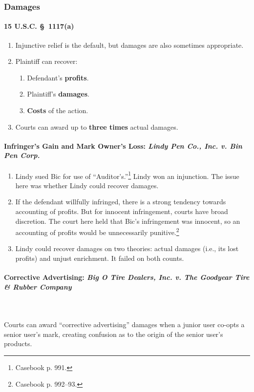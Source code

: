 \subsubsection{Damages}

\paragraph{15 U.S.C. \S\ 1117(a)}

\begin{enumerate}
    \item Injunctive relief is the default, but damages are also sometimes 
    appropriate.
    \item Plaintiff can recover:
    \begin{enumerate}
        \item Defendant's \textbf{profits}.
        \item Plaintiff's \textbf{damages}.
        \item \textbf{Costs} of the action.
    \end{enumerate}
    \item Courts can award up to \textbf{three times} actual damages.
\end{enumerate}

\paragraph{Infringer's Gain and Mark Owner's Loss: \emph{Lindy Pen Co., Inc. 
v. Bin Pen Corp.}}

\begin{enumerate}
    \item Lindy sued Bic for use of ``Auditor's.''\footnote{Casebook p. 991.} 
    Lindy won an injunction. The issue here was whether Lindy could recover 
    damages.
    \item If the defendant willfully infringed, there is a strong tendency 
    towards accounting of profits. But for innocent infringement, courts have 
    broad discretion. The court here held that Bic's infringement was 
    innocent, so an accounting of profits would be unnecessarily 
    punitive.\footnote{Casebook p. 992--93.}
    \item Lindy could recover damages on two theories: actual damages (i.e., 
    its lost profits) and unjust enrichment. It failed on both counts.
\end{enumerate}

\paragraph{Corrective Advertising: \emph{Big O Tire Dealers, Inc. v. The 
Goodyear Tire \& Rubber Company}}
~\\\\
Courts can award ``corrective advertising'' damages when a junior user co-opts 
a senior user's mark, creating confusion as to the origin of the senior user's 
products.

